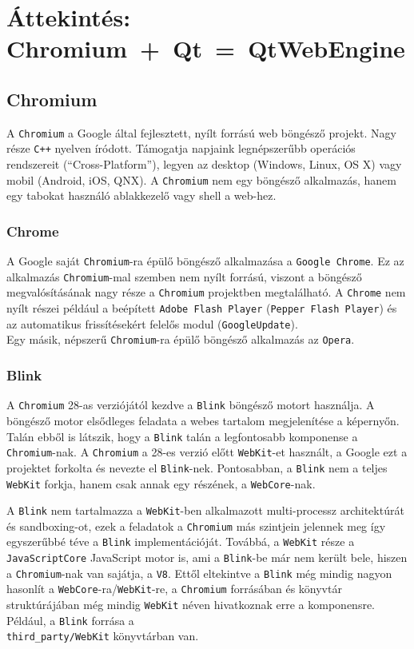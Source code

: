 \documentclass[12pt]{report}
\begin{document}
\chapter{Áttekintés: \mbox{Chromium + Qt = QtWebEngine}}

\section{Chromium}
A \texttt{Chromium} a Google által fejlesztett, nyílt forrású web böngésző projekt. Nagy
része \texttt{C++} nyelven íródott. Támogatja napjaink legnépszerűbb operációs rendszereit
(``Cross-Platform''), legyen az desktop (Windows, Linux, OS X) vagy mobil (Android, iOS,
QNX).
A \texttt{Chromium} nem egy böngésző alkalmazás, hanem egy tabokat használó ablakkezelő
vagy shell a web-hez.
\cite{bib-wiki-chromium}

\subsection{Chrome}
A Google saját \texttt{Chromium}-ra épülő böngésző alkalmazása a \texttt{Google Chrome}.
Ez az alkalmazás \texttt{Chromium}-mal szemben nem nyílt forrású, viszont a böngésző
megvalósításának nagy része a \texttt{Chromium} projektben megtalálható.
A \texttt{Chrome} nem nyílt részei például a beépített \texttt{Adobe Flash Player}
(\texttt{Pepper Flash Player}) és az automatikus frissítésekért felelős modul
(\texttt{GoogleUpdate}). \cite{bib-wiki-chrome} \\
Egy másik, népszerű \texttt{Chromium}-ra épülő böngésző alkalmazás az \texttt{Opera}.

\subsection{Blink}
A \texttt{Chromium} 28-as verziójától kezdve a \texttt{Blink} böngésző motort használja.
A böngésző motor elsődleges feladata a webes tartalom megjelenítése a képernyőn. Talán
ebből is látszik, hogy a \texttt{Blink} talán a legfontosabb komponense
a \texttt{Chromium}-nak. A \texttt{Chromium} a 28-es verzió előtt \texttt{WebKit}-et
használt, a Google ezt a projektet forkolta és nevezte el \texttt{Blink}-nek. Pontosabban,
a \texttt{Blink} nem a teljes \texttt{WebKit} forkja, hanem csak annak egy részének, a
\texttt{WebCore}-nak.
\cite{bib-wiki-blink}

A \texttt{Blink} nem tartalmazza a \texttt{WebKit}-ben alkalmazott multi-processz
architektúrát és sandboxing-ot, ezek a feladatok a \texttt{Chromium} más szintjein jelennek
meg így egyszerűbbé téve a \texttt{Blink} implementációját. Továbbá, a \texttt{WebKit} része
a \texttt{JavaScriptCore} JavaScript motor is, ami a \texttt{Blink}-be már nem került bele,
hiszen a \texttt{Chromium}-nak van sajátja, a \texttt{V8}.
Ettől eltekintve a \texttt{Blink} még mindig nagyon hasonlít a
\texttt{WebCore}-ra/\texttt{WebKit}-re, a \texttt{Chromium}
forrásában és könyvtár struktúrájában még mindig \texttt{WebKit} néven hivatkoznak erre a
komponensre. Például, a \texttt{Blink} forrása a \\
\texttt{third\_party/WebKit} könyvtárban van.
\cite{bib-chromium-displays-web-pages, bib-chromium-blink}
\end{document}
